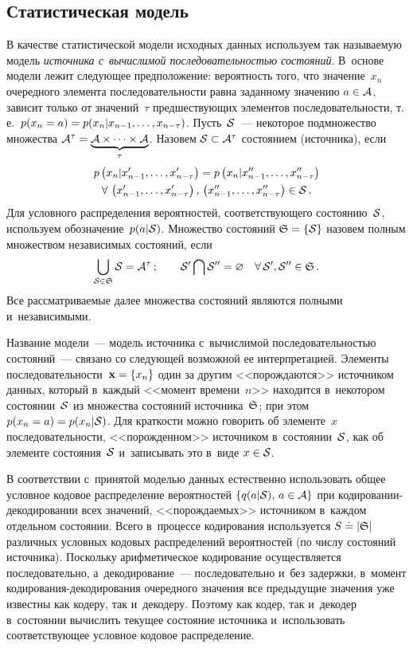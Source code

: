 \begin{multicols}{2}
\subsection{Статистическая модель}

В качестве статистической модели исходных данных используем так 
называемую модель \textit{источника с~вычислимой последовательностью состояний}. 
В~основе модели лежит следующее предположение: вероятность того, что значение~$x_n$ 
очередного элемента последовательности равна заданному значению
$a\hm\in{\cal A}$, зависит только от значений~$\tau$ предшествующих элементов 
последовательности, т.\,е.\ 
$p(x_n=a)\hm=p(x_n|x_{n-1},\ldots,x_{n-\tau})$. Пусть~${\cal S}$~--- 
некоторое подмножество множества  ${\cal A}^\tau \hm= 
\underbrace{{\cal A}\times\dots\times{\cal A}}_{\tau}$. 
Назовем ${\cal S}\hm\subset{\cal A}^\tau $ состоянием (источника), если
\begin{multline*}
p\left(x_n|x'_{n-1},\dots,x'_{n-\tau}\right) = 
p\left(x_n|x''_{n-1},\dots,x''_{n-\tau}\right)\\
\forall \, \left(x'_{n-1},\dots,x'_{n-\tau}\right),\,
\left(x''_{n-1},\dots,x''_{n-\tau}\right)\in{\cal S}\,.
\end{multline*}
Для условного распределения вероятностей, соответствующего состоянию~${\cal S}$, 
используем обозначение~$p(a|{\cal S})$. Множество состояний ${\frak S}\hm=\{\cal S\}$ 
назовем полным множеством независимых состояний, если
$$
\bigcup\limits_{{\cal S}\in{\frak S}}{\cal S} = {\cal A}^\tau\,;
\quad  \quad
{\cal S}'\bigcap{\cal S}'' = \varnothing\quad
\forall\,{\cal S}',{\cal S}''\in{\frak S}\,.
$$
Все рассматриваемые далее множества состояний являются полными и~независимыми.

Название модели~--- модель источника с~вы\-чис\-ли\-мой последовательностью состояний~--- 
связано со следующей возможной ее интерпретацией. Элементы 
последовательности~$\mathbf{x}\hm=\{x_n\}$ один за другим <<порождаются>> 
источником данных, который в~каж\-дый <<момент времени~$n$>>  
находится в~некотором состоянии~${\cal S}$ из множества состояний 
источника~${\frak S}$; при этом $p(x_n\hm=a)\hm= p(x_n|{\cal S})$. 
Для краткости можно говорить об элементе~$x$ последовательности, <<порожденном>> 
источником в~состоянии~${\cal S}$, как об элементе состояния~${\cal S}$ и~записывать 
это в~виде $x\hm\in{\cal S}$.

В соответствии с~принятой моделью данных естественно использовать общее условное 
кодовое распределение вероятностей $\{q(a|{\cal S}),\,a\hm\in{\cal A}\}$ 
при ко\-ди\-ро\-ва\-нии-де\-ко\-ди\-ро\-ва\-нии всех значений, <<порождаемых>> 
источником в~каждом отдельном состоянии. Всего в~процессе кодирования 
используется $S\doteq|{\frak S}|$ различных условных кодовых 
распределений вероятностей (по числу состояний источника). Поскольку 
арифметическое кодирование осуществляется последовательно, а~декодирование~--- 
последовательно и~без задержки, в~момент ко\-ди\-ро\-ва\-ния-де\-ко\-ди\-ро\-ва\-ния 
очередного значения все предыдущие значения уже известны как кодеру, так и~декодеру. 
Поэтому как кодер, так и~декодер в~состоянии вычислить текущее состояние источника 
и~использовать соответствующее условное кодовое распределение.


\end{multicols}
